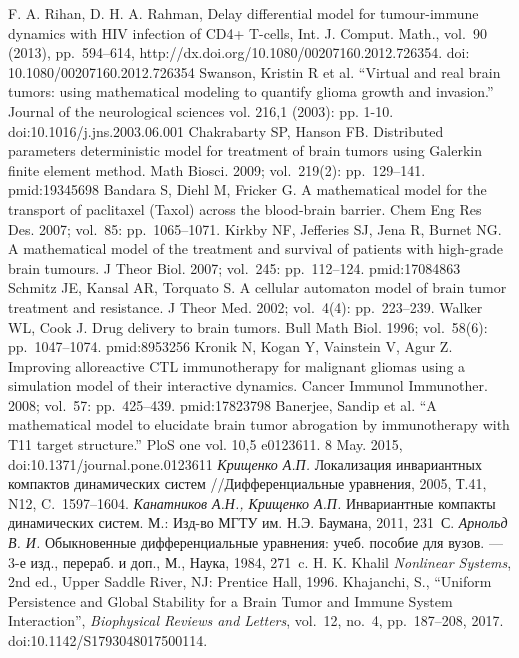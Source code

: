 \documentclass[14pt,a4paper]{extarticle}
\begin{document}
\begin{thebibliography}{\kern\bibindent}
		F. A. Rihan, D. H. A. Rahman, Delay differential model for tumour-immune dynamics with HIV infection of CD4+ T-cells, Int. J. Comput. Math., vol.~90 (2013), pp.~594–614, http://dx.doi.org/10.1080/00207160.2012.726354. doi: 10.1080/00207160.2012.726354 
		Swanson, Kristin R et al. “Virtual and real brain tumors: using mathematical modeling to quantify glioma growth and invasion.” Journal of the neurological sciences vol. 216,1 (2003): pp. 1-10. doi:10.1016/j.jns.2003.06.001
		Chakrabarty SP, Hanson FB. Distributed parameters deterministic model for treatment of brain tumors using Galerkin finite element method. Math Biosci. 2009; vol.~219(2): pp.~129–141. pmid:19345698
		Bandara S, Diehl M, Fricker G. A mathematical model for the transport of paclitaxel (Taxol) across the blood-brain barrier. Chem Eng Res Des. 2007; vol.~85: pp.~1065–1071.
		Kirkby NF, Jefferies SJ, Jena R, Burnet NG. A mathematical model of the treatment and survival of patients with high-grade brain tumours. J Theor Biol. 2007; vol.~245: pp.~112–124. pmid:17084863
		Schmitz JE, Kansal AR, Torquato S. A cellular automaton model of brain tumor treatment and resistance. J Theor Med. 2002; vol.~4(4): pp.~223–239.
		Walker WL, Cook J. Drug delivery to brain tumors. Bull Math Biol. 1996; vol.~58(6): pp.~1047–1074. pmid:8953256
		Kronik N, Kogan Y, Vainstein V, Agur Z. Improving alloreactive CTL immunotherapy for malignant gliomas using a simulation model of their interactive dynamics. Cancer Immunol Immunother. 2008; vol.~57: pp.~425–439. pmid:17823798
		Banerjee, Sandip et al. “A mathematical model to elucidate brain tumor abrogation by immunotherapy with T11 target structure.” PloS one vol. 10,5 e0123611. 8 May. 2015, doi:10.1371/journal.pone.0123611
		\textit{Крищенко А.П.} Локализация инвариантных компактов динамических систем //Дифференциальные уравнения, 2005, Т.41, N12, C.~1597--1604.
		\textit{Канатников А.Н., Крищенко А.П.} Инвариантные компакты динамических систем. М.: Изд-во МГТУ им. Н.Э. Баумана, 2011, 231~С.
		\textit{Арнольд В. И.} Обыкновенные дифференциальные уравнения: учеб. пособие для вузов. --- 3-е изд., перераб. и доп., М., Наука, 1984, 271~c.
		H. K. Khalil \textit{Nonlinear Systems}, 2nd ed., Upper Saddle River, NJ: Prentice Hall, 1996.
		Khajanchi, S., “Uniform Persistence and Global Stability for a Brain Tumor and Immune System Interaction”, \textit{Biophysical Reviews and Letters}, vol.~12, no.~4, pp.~187–208, 2017. doi:10.1142/S1793048017500114.
	\end{thebibliography}
	
\end{document}
